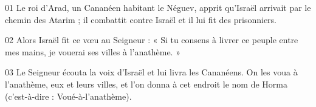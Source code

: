 01 Le roi d’Arad, un Cananéen habitant le Néguev, apprit qu’Israël arrivait par le chemin des Atarim ; il combattit contre Israël et il lui fit des prisonniers.

02 Alors Israël fit ce vœu au Seigneur : « Si tu consens à livrer ce peuple entre mes mains, je vouerai ses villes à l’anathème. »

03 Le Seigneur écouta la voix d’Israël et lui livra les Cananéens. On les voua à l’anathème, eux et leurs villes, et l’on donna à cet endroit le nom de Horma (c’est-à-dire : Voué-à-l’anathème).
